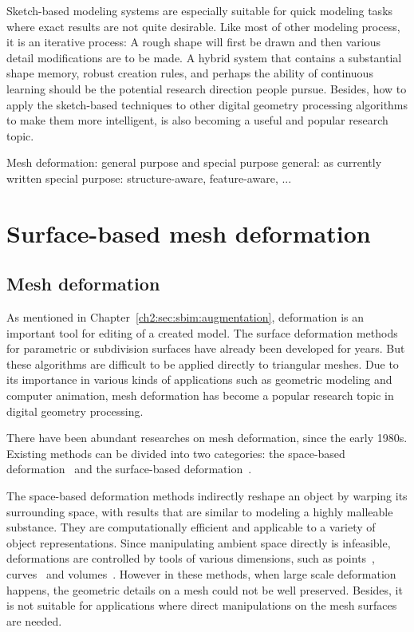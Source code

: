 Sketch-based modeling systems are especially suitable for quick modeling tasks where exact results are not quite desirable. Like most of other modeling process, it is an iterative process: A rough shape will first be drawn and then various detail modifications are to be made. A hybrid system that contains a substantial shape memory, robust creation rules, and perhaps the ability of continuous learning should be the potential research direction people pursue. Besides, how to apply the sketch-based techniques to other digital geometry processing algorithms to make them more intelligent, is also becoming a useful and popular research topic.


Mesh deformation: general purpose and special purpose
general: as currently written
special purpose: structure-aware, feature-aware, ...


\section{Surface-based mesh deformation}\label{ch2:sec:deformation}

\subsection{Mesh deformation}\label{ch2:sec:deformation:intro}

As mentioned in Chapter~\ref{ch2:sec:sbim:augmentation}, deformation is an important tool for editing of a created model. The surface deformation methods for parametric or subdivision surfaces have already been developed for years. But these algorithms are difficult to be applied directly to triangular meshes. Due to its importance in various kinds of applications such as geometric modeling and computer animation, mesh deformation has become a popular research topic in digital geometry processing.

There have been abundant researches on mesh deformation, since the early 1980s. Existing methods can be divided into two categories: the space-based deformation~\cite{GB08} and the surface-based deformation~\cite{BS08}.

The space-based deformation methods indirectly reshape an object by warping its surrounding space, with results that are similar to modeling a highly malleable substance. They are computationally efficient and applicable to a variety of object representations. Since manipulating ambient space directly is infeasible, deformations are controlled by tools of various dimensions, such as points~\cite{BK05}, curves~\cite{SF98,PJF97} and volumes~\cite{SP86,JSW05,LLC08}. However in these methods, when large scale deformation happens, the geometric details on a mesh could not be well preserved. Besides, it is not suitable for applications where direct manipulations on the mesh surfaces are needed.

